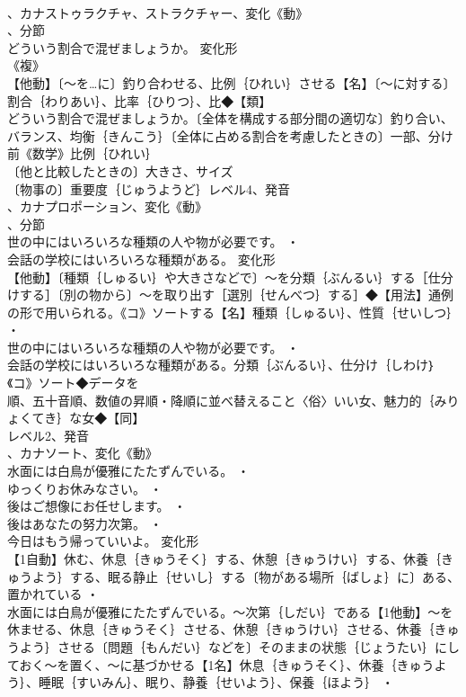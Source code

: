 \documentclass[8pt]{extreport}
\begin{document}
\begin{CJK}{UTF8}{min}
\\	、カナストゥラクチャ、ストラクチャー、変化《動》
\\	、分節
\\	どういう割合で混ぜましょうか。	変化形 
\\	《複》
\\	【他動】〔～を…に〕釣り合わせる、比例｛ひれい｝させる【名】〔～に対する〕割合｛わりあい｝、比率｛ひりつ｝、比◆【類】
\\	どういう割合で混ぜましょうか。〔全体を構成する部分間の適切な〕釣り合い、バランス、均衡｛きんこう｝〔全体に占める割合を考慮したときの〕一部、分け前《数学》比例｛ひれい｝
\\	〔他と比較したときの〕大きさ、サイズ
\\	〔物事の〕重要度｛じゅうようど｝レベル4、発音
\\	、カナプロポーション、変化《動》
\\	、分節
\\	世の中にはいろいろな種類の人や物が必要です。 ・
\\	会話の学校にはいろいろな種類がある。	変化形 
\\	【他動】〔種類｛しゅるい｝や大きさなどで〕～を分類｛ぶんるい｝する［仕分けする］〔別の物から〕～を取り出す［選別｛せんべつ｝する］◆【用法】通例
\\	の形で用いられる。《コ》ソートする【名】種類｛しゅるい｝、性質｛せいしつ｝ ・
\\	世の中にはいろいろな種類の人や物が必要です。 ・
\\	会話の学校にはいろいろな種類がある。分類｛ぶんるい｝、仕分け｛しわけ｝《コ》ソート◆データを
\\	順、五十音順、数値の昇順・降順に並べ替えること〈俗〉いい女、魅力的｛みりょくてき｝な女◆【同】
\\	レベル2、発音
\\	、カナソート、変化《動》
\\	水面には白鳥が優雅にたたずんでいる。 ・
\\	ゆっくりお休みなさい。 ・
\\	後はご想像にお任せします。 ・
\\	後はあなたの努力次第。 ・
\\	今日はもう帰っていいよ。	変化形 
\\	【1自動】休む、休息｛きゅうそく｝する、休憩｛きゅうけい｝する、休養｛きゅうよう｝する、眠る静止｛せいし｝する〔物がある場所｛ばしょ｝に〕ある、置かれている ・
\\	水面には白鳥が優雅にたたずんでいる。～次第｛しだい｝である【1他動】～を休ませる、休息｛きゅうそく｝させる、休憩｛きゅうけい｝させる、休養｛きゅうよう｝させる〔問題｛もんだい｝などを〕そのままの状態｛じょうたい｝にしておく～を置く、～に基づかせる【1名】休息｛きゅうそく｝、休養｛きゅうよう｝、睡眠｛すいみん｝、眠り、静養｛せいよう｝、保養｛ほよう｝ ・

\end{CJK}
\end{document}

